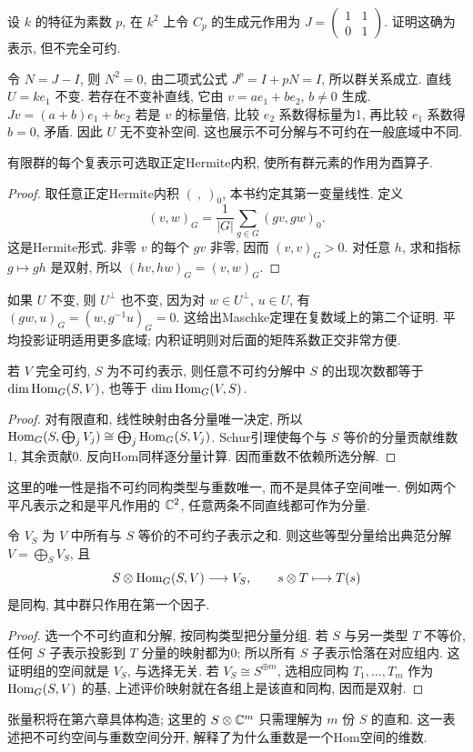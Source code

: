 \begin{example}\label{ex:modular}
设 $k$ 的特征为素数 $p$, 在 $k^2$ 上令 $C_p$ 的生成元作用为 $J=\begin{pmatrix}1&1\\0&1\end{pmatrix}$. 证明这确为表示, 但不完全可约.
\end{example}
\begin{solution}
令 $N=J-I$, 则 $N^2=0$, 由二项式公式 $J^p=I+pN=I$, 所以群关系成立. 直线 $U=ke_1$ 不变. 若存在不变补直线, 它由 $v=ae_1+be_2$, $b\ne0$ 生成. $Jv=(a+b)e_1+be_2$ 若是 $v$ 的标量倍, 比较 $e_2$ 系数得标量为1, 再比较 $e_1$ 系数得 $b=0$, 矛盾. 因此 $U$ 无不变补空间. 这也展示不可分解与不可约在一般底域中不同.
\end{solution}

\begin{proposition}\label{prop:unitary}
有限群的每个复表示可选取正定Hermite内积, 使所有群元素的作用为酉算子.
\end{proposition}
\begin{proof}
取任意正定Hermite内积 $(\ ,\ )_0$, 本书约定其第一变量线性. 定义
\[
 (v,w)_G=\frac1{|G|}\sum_{g\in G}(gv,gw)_0.
\]
这是Hermite形式. 非零 $v$ 的每个 $gv$ 非零, 因而 $(v,v)_G>0$. 对任意 $h$, 求和指标 $g\mapsto gh$ 是双射, 所以 $(hv,hw)_G=(v,w)_G$.
\end{proof}
如果 $U$ 不变, 则 $U^\perp$ 也不变, 因为对 $w\in U^\perp$, $u\in U$, 有 $(gw,u)_G=(w,g^{-1}u)_G=0$. 这给出Maschke定理在复数域上的第二个证明. 平均投影证明适用更多底域; 内积证明则对后面的矩阵系数正交非常方便.

\begin{proposition}\label{prop:multiplicity}
若 $V$ 完全可约, $S$ 为不可约表示, 则任意不可约分解中 $S$ 的出现次数都等于 $\dim\operatorname{Hom}_G(S,V)$, 也等于 $\dim\operatorname{Hom}_G(V,S)$.
\end{proposition}
\begin{proof}
对有限直和, 线性映射由各分量唯一决定, 所以
$\operatorname{Hom}_G(S,\bigoplus_j V_j)\cong\bigoplus_j\operatorname{Hom}_G(S,V_j)$. Schur引理使每个与 $S$ 等价的分量贡献维数1, 其余贡献0. 反向Hom同样逐分量计算. 因而重数不依赖所选分解.
\end{proof}
这里的唯一性是指不可约同构类型与重数唯一, 而不是具体子空间唯一. 例如两个平凡表示之和是平凡作用的 $\mathbb C^2$, 任意两条不同直线都可作为分量.

\begin{proposition}
令 $V_S$ 为 $V$ 中所有与 $S$ 等价的不可约子表示之和. 则这些等型分量给出典范分解 $V=\bigoplus_S V_S$, 且
\[
 S\otimes\operatorname{Hom}_G(S,V)\longrightarrow V_S,\qquad s\otimes T\longmapsto T(s)
\]
是同构, 其中群只作用在第一个因子.
\end{proposition}
\begin{proof}
选一个不可约直和分解, 按同构类型把分量分组. 若 $S$ 与另一类型 $T$ 不等价, 任何 $S$ 子表示投影到 $T$ 分量的映射都为0; 所以所有 $S$ 子表示恰落在对应组内. 这证明组的空间就是 $V_S$, 与选择无关. 若 $V_S\cong S^{\oplus m}$, 选相应同构 $T_1,\ldots,T_m$ 作为 $\operatorname{Hom}_G(S,V)$ 的基, 上述评价映射就在各组上是该直和同构, 因而是双射.
\end{proof}
张量积将在第六章具体构造; 这里的 $S\otimes\mathbb C^m$ 只需理解为 $m$ 份 $S$ 的直和. 这一表述把不可约空间与重数空间分开, 解释了为什么重数是一个Hom空间的维数.

